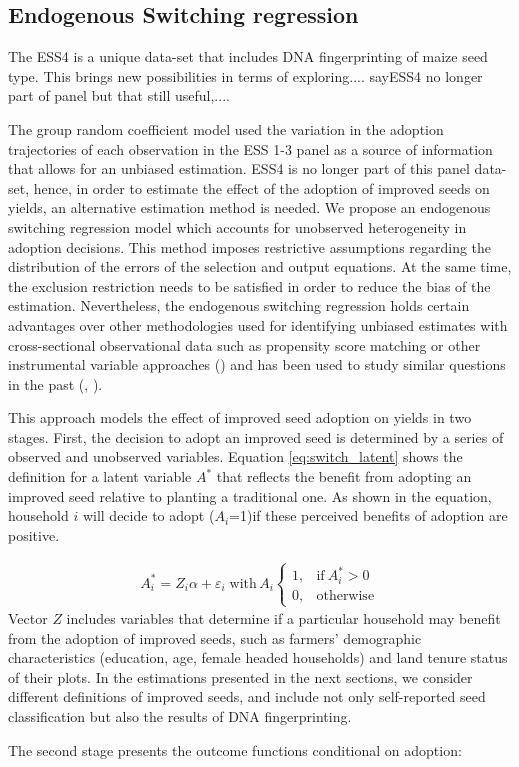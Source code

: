 \documentclass{article}
\begin{document}
\subsection{Endogenous Switching regression}
The ESS4 is a unique data-set that includes DNA fingerprinting of maize seed type. This brings new possibilities in terms of exploring.... sayESS4 no longer part of panel but that still useful,.... \par
The group random coefficient model used the variation in the adoption trajectories of each observation in the ESS 1-3 panel as a source of information that allows for an unbiased estimation. ESS4 is no longer part of this panel data-set, hence, in order to estimate the effect of the adoption of improved seeds on yields, an alternative estimation method is needed. We propose an endogenous switching regression model which accounts for unobserved heterogeneity in adoption decisions. This method imposes restrictive assumptions regarding the distribution of the errors of the selection and output equations. At the same time, the exclusion restriction needs to be satisfied in order to reduce the bias of the estimation. Nevertheless, the endogenous switching regression holds certain advantages over other methodologies used for identifying unbiased estimates with cross-sectional observational data such as propensity score matching or other instrumental variable approaches (\cite{shiferaw2014adoption}) and has been used to study similar questions in the past (\citealt{falco2011does}, \citealt{kabunga2012yield}). \par
This approach models the effect of improved seed adoption on yields in two stages. First, the decision to adopt an improved seed is determined by a series of observed and unobserved variables. Equation \ref{eq:switch_latent} shows the definition for a latent variable $A^*$ that reflects the benefit from adopting an improved seed relative to planting a traditional one. As shown in the equation, household $i$ will decide to adopt ($A_i$=1)if these perceived benefits of adoption are positive.

\begin{align}
A_i^*=Z_i\alpha+\varepsilon_i \; \text{with} \, A_i    \begin{cases}
      1, & \text{if}\ A_i^*>0 \\
      0, & \text{otherwise}
    \end{cases} \label{eq:switch_latent}
\end{align}
Vector $Z$ includes variables that determine if a particular household may benefit from the adoption of improved seeds, such as farmers' demographic characteristics (education, age, female headed households) and land tenure status of their plots. In the estimations presented in the next sections, we consider different definitions of improved seeds, and include not only self-reported seed classification but also the results of DNA fingerprinting.  \par
The second stage presents the outcome functions conditional on adoption:
\begin{align}
    
\end{align}
\end{document}
